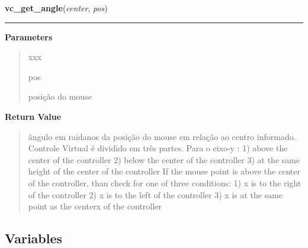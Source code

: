 \hspace{.8\funcindent}\begin{boxedminipage}{\funcwidth}

    \raggedright \textbf{vc\_get\_angle}(\textit{center}, \textit{pos})

    \vspace{-1.5ex}

    \rule{\textwidth}{0.5\fboxrule}
\setlength{\parskip}{2ex}
\setlength{\parskip}{1ex}
      \textbf{Parameters}
      \vspace{-1ex}

      \begin{quote}
        \begin{Ventry}{xxx}

          \item[pos]

          posição do mouse

        \end{Ventry}

      \end{quote}

      \textbf{Return Value}
    \vspace{-1ex}

      \begin{quote}
      ângulo em raidanos da posição do mouse em relação ao centro 
      informado. Controle Virtual é dividido em três partes. Para o eixo-y 
      : 1) above the center of the controller 2) below the center of the 
      controller 3) at the same height of the center of the controller If 
      the mouse point is above the center of the controller, than check for
      one of three conditions: 1) x is to the right of the controller 2) x 
      is to the left of the controller 3) x is at the same point as the 
      centerx of the controller

      \end{quote}

    \end{boxedminipage}



  \subsection{Variables}

